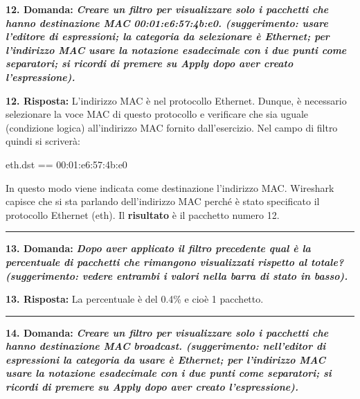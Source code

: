\documentclass[a4paper]{article}
\newcommand{\longline}{\noindent\rule{\textwidth}{0.4pt}}
\begin{document}
	\noindent
	\textcolor{Red3}{\textbf{12. Domanda:}} \textbf{\emph{Creare un filtro per visualizzare solo i pacchetti che hanno destinazione MAC 00:01:e6:57:4b:e0.\newline
			(\emph{suggerimento}: usare l'editore di espressioni; la categoria da selezionare è \textsf{Ethernet}; per l'indirizzo MAC usare la notazione esadecimale con i due punti come separatori; si ricordi di premere su \textsf{Apply} dopo aver creato l'espressione).}}\newline
	
	
	\noindent
	\textcolor{Green4}{\textbf{12. Risposta:}} L'indirizzo MAC è nel protocollo Ethernet. Dunque, è necessario selezionare la voce MAC di questo protocollo e verificare che sia uguale (condizione logica) all'indirizzo MAC fornito dall'esercizio. Nel campo di filtro quindi si scriverà:
	\begin{center}
		\textsf{eth.dst == 00:01:e6:57:4b:e0}
	\end{center}
	
	\noindent
	In questo modo viene indicata come destinazione l'indirizzo MAC. Wireshark capisce che si sta parlando dell'indirizzo MAC perché è stato specificato il protocollo Ethernet (\textsf{eth}). Il \textbf{risultato} è il pacchetto numero 12.
	
	\longline\newline
	
	\noindent
	\textcolor{Red3}{\textbf{13. Domanda:}} \textbf{\emph{Dopo aver applicato il filtro precedente qual è la percentuale di pacchetti che rimangono visualizzati rispetto al totale?\newline
			(\emph{suggerimento}: vedere entrambi i valori nella barra di stato in basso).}}\newline
	
	
	\noindent
	\textcolor{Green4}{\textbf{13. Risposta:}} La percentuale è del 0.4\% e cioè 1 pacchetto.
	
	\longline\newline
	
	\noindent
	\textcolor{Red3}{\textbf{14. Domanda:}} \textbf{\emph{Creare un filtro per visualizzare solo i pacchetti che hanno destinazione MAC broadcast.\newline
			(\emph{suggerimento}: nell'editor di espressioni la categoria da usare è \textsf{Ethernet}; per l'indirizzo MAC usare la notazione esadecimale con i due punti come separatori; si ricordi di premere su \textsf{Apply} dopo aver creato l'espressione).}}\newline
	
\end{document}
